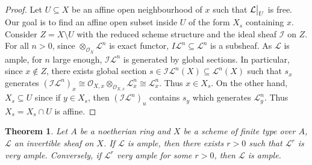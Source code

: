 \documentclass{ctexart}
\newtheorem{theorem}{Theorem}[section]
\begin{document}
\begin{proof}
    Let $U \subseteq X$ be an affine open neighbourhood of $x$ such that $\mathcal{L}\big{|}_{U}$ is free.
    Our goal is to find an affine open subset inside $U$ of the form $X_{s}$ containing $x$.
    Consider $Z = X \setminus U$ with the reduced scheme structure and the ideal sheaf $\mathcal{I}$ on $Z$.
    For all $n > 0$, since $\otimes_{\mathcal{O}_{X}} \mathcal{L}^{n}$ is exact functor, $I\mathcal{L}^{n} \subseteq \mathcal{L}^{n}$ is a subsheaf.
    As $\mathcal{L}$ is ample, for $n$ large enough, $\mathcal{I}\mathcal{L}^{n}$ is generated by global sections.
    In particular, since $x\notin Z$, there exists global section $s\in \mathcal{I}\mathcal{L}^{n}(X) \subseteq \mathcal{L}^{n}(X)$ such that $s_{x}$ generates $(\mathcal{I}\mathcal{L}^{n})_{x} \cong \mathcal{O}_{X, x} \otimes_{\mathcal{O}_{X, x}} \mathcal{L}_{x}^{n} \cong \mathcal{L}_{x}^{n}$.
    Thus $x\in X_{s}$.
    On the other hand, $X_{s} \subseteq U$ since if $y\in X_{s}$, then $(\mathcal{I}\mathcal{L}^{n})_{u}$ contains $s_{y}$ which generates $\mathcal{L}_{y}^{n}$.
    Thus $X_{s} = X_{s} \cap U$ is affine.
\end{proof}
\begin{theorem}
    Let $A$ be a noetherian ring and $X$ be a scheme of finite type over $A$, $\mathcal{L}$ an invertible sheaf on $X$.
    If $\mathcal{L}$ is ample, then there exists $r > 0$ such that $\mathcal{L}^{r}$ is very ample.
    Conversely, if $\mathcal{L}^{r}$ very ample for some $r > 0$, then $\mathcal{L}$ is ample.
    \label{Theorem 6.6}
\end{theorem}
\end{document}
